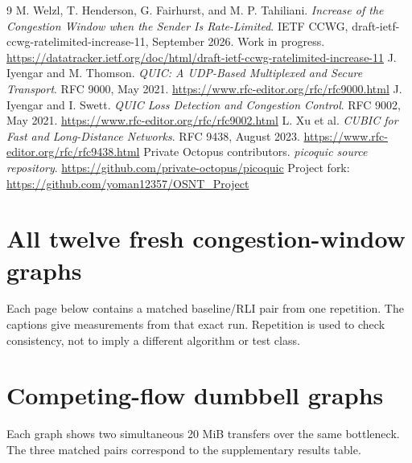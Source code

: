 \documentclass[11pt,a4paper]{article}
\begin{document}
\clearpage
\begin{thebibliography}{9}
 M. Welzl, T. Henderson, G. Fairhurst, and M. P. Tahiliani.
\emph{Increase of the Congestion Window when the Sender Is Rate-Limited}.
IETF CCWG, draft-ietf-ccwg-ratelimited-increase-11, September 2026.
Work in progress. \url{https://datatracker.ietf.org/doc/html/draft-ietf-ccwg-ratelimited-increase-11}
 J. Iyengar and M. Thomson. \emph{QUIC: A UDP-Based Multiplexed
and Secure Transport}. RFC 9000, May 2021.
\url{https://www.rfc-editor.org/rfc/rfc9000.html}
 J. Iyengar and I. Swett. \emph{QUIC Loss Detection and
Congestion Control}. RFC 9002, May 2021.
\url{https://www.rfc-editor.org/rfc/rfc9002.html}
 L. Xu et al. \emph{CUBIC for Fast and Long-Distance Networks}.
RFC 9438, August 2023. \url{https://www.rfc-editor.org/rfc/rfc9438.html}
 Private Octopus contributors. \emph{picoquic source repository}.
\url{https://github.com/private-octopus/picoquic}
Project fork: \url{https://github.com/yoman12357/OSNT_Project}
\end{thebibliography}

\appendix
\clearpage
\section{All twelve fresh congestion-window graphs}
Each page below contains a matched baseline/RLI pair from one repetition.
The captions give measurements from that exact run. Repetition is used
to check consistency, not to imply a different algorithm or test class.

\clearpage
\section{Competing-flow dumbbell graphs}
Each graph shows two simultaneous 20 MiB transfers over the same bottleneck.
The three matched pairs correspond to the supplementary results table.

\end{document}
